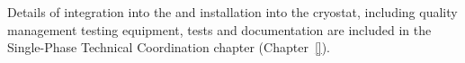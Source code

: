 Details of  integration into the  and installation into the cryostat, including quality management testing equipment, tests and documentation are included in the Single-Phase Technical Coordination chapter (Chapter~\ref{}).





    





